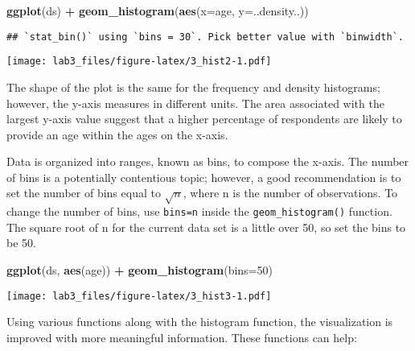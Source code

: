 \documentclass[]{article}
\newenvironment{Shaded}{\begin{snugshade}}{\end{snugshade}}
\newcommand{\KeywordTok}[1]{\textcolor[rgb]{0.13,0.29,0.53}{\textbf{#1}}}
\newcommand{\DataTypeTok}[1]{\textcolor[rgb]{0.13,0.29,0.53}{#1}}
\newcommand{\DecValTok}[1]{\textcolor[rgb]{0.00,0.00,0.81}{#1}}
\newcommand{\StringTok}[1]{\textcolor[rgb]{0.31,0.60,0.02}{#1}}
\newcommand{\OperatorTok}[1]{\textcolor[rgb]{0.81,0.36,0.00}{\textbf{#1}}}
\newcommand{\NormalTok}[1]{#1}
\begin{document}
\begin{Shaded}
\begin{Highlighting}[]
\KeywordTok{ggplot}\NormalTok{(ds) }\OperatorTok{+}
\StringTok{  }\KeywordTok{geom_histogram}\NormalTok{(}\KeywordTok{aes}\NormalTok{(}\DataTypeTok{x=}\NormalTok{age, }\DataTypeTok{y=}\NormalTok{..density..))}
\end{Highlighting}
\end{Shaded}

\begin{verbatim}
## `stat_bin()` using `bins = 30`. Pick better value with `binwidth`.
\end{verbatim}

\texttt{[image: lab3\_files/figure-latex/3\_hist2-1.pdf]}

The shape of the plot is the same for the frequency and density
histograms; however, the y-axis measures in different units. The area
associated with the largest y-axis value suggest that a higher
percentage of respondents are likely to provide an age within the ages
on the x-axis.

Data is organized into ranges, known as bins, to compose the x-axis. The
number of bins is a potentially contentious topic; however, a good
recommendation is to set the number of bins equal to \(\sqrt n\), where
n is the number of observations. To change the number of bins, use
\texttt{bins=n} inside the \texttt{geom\_histogram()} function. The
square root of n for the current data set is a little over 50, so set
the bins to be 50.

\begin{Shaded}
\begin{Highlighting}[]
\KeywordTok{ggplot}\NormalTok{(ds, }\KeywordTok{aes}\NormalTok{(age)) }\OperatorTok{+}
\StringTok{  }\KeywordTok{geom_histogram}\NormalTok{(}\DataTypeTok{bins=}\DecValTok{50}\NormalTok{)}
\end{Highlighting}
\end{Shaded}

\texttt{[image: lab3\_files/figure-latex/3\_hist3-1.pdf]}

Using various functions along with the histogram function, the
visualization is improved with more meaningful information. These
functions can help:
\end{document}
